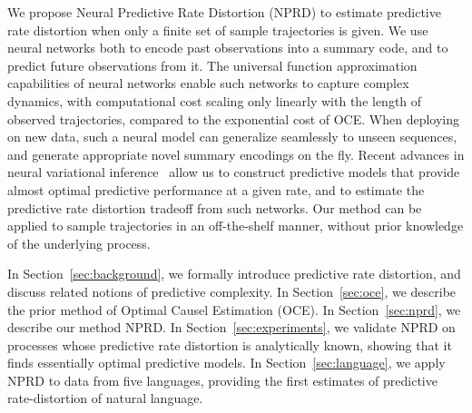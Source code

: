 \documentclass[entropy,article,submit,moreauthors,pdftex,10pt,a4paper]{Definitions/mdpi}
\begin{document}
We propose Neural Predictive Rate Distortion (NPRD) to estimate predictive rate distortion when only a finite set of sample trajectories is given.
We use neural networks both to encode past observations into a summary code, and to predict future observations from it.
The universal function approximation capabilities of neural networks enable such networks to capture complex dynamics, with computational cost scaling only linearly with the length of observed trajectories, compared to the exponential cost of OCE.
When deploying on new data, such a neural model can generalize seamlessly to unseen sequences, and generate appropriate novel summary encodings on the fly.
Recent advances in neural variational inference~\citep{rezende-variational-2015,huang-neural-2018} allow us to construct predictive models that provide almost optimal predictive performance at a given rate, and to estimate the predictive rate distortion tradeoff from such networks.
Our method can be applied to sample trajectories in an off-the-shelf manner, without prior knowledge of the underlying process.

In Section~\ref{sec:background}, we formally introduce predictive rate distortion, and discuss related notions of predictive complexity.
In Section~\ref{sec:oce}, we describe the prior method of Optimal Causel Estimation (OCE).
In Section~\ref{sec:nprd}, we describe our method NPRD.
In Section~\ref{sec:experiments}, we validate NPRD on processes whose predictive rate distortion is analytically known, showing that it finds essentially optimal predictive models.
In Section~\ref{sec:language}, we apply NPRD to data from five languages, providing the first estimates of predictive rate-distortion of natural language.


\end{document}
